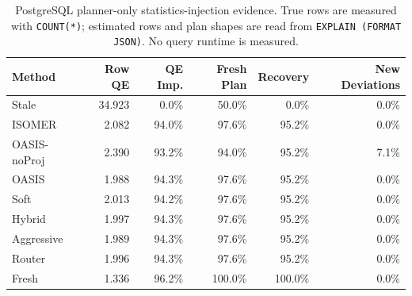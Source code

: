 \begin{table}[t]
  \centering
  \small
  \caption{PostgreSQL planner-only statistics-injection evidence. True rows are measured with \texttt{COUNT(*)}; estimated rows and plan shapes are read from \texttt{EXPLAIN (FORMAT JSON)}. No query runtime is measured.}
  \label{tab:postgres_planner_stats_injection}
  \setlength{\tabcolsep}{4pt}
  \begin{tabular}{lrrrrr}
    \toprule
    Method & Row QE & QE Imp. & Fresh Plan & Recovery & New Deviations \\
    \midrule
    Stale & 34.923 & 0.0\% & 50.0\% & 0.0\% & 0.0\% \\
    ISOMER & 2.082 & 94.0\% & 97.6\% & 95.2\% & 0.0\% \\
    OASIS-noProj & 2.390 & 93.2\% & 94.0\% & 95.2\% & 7.1\% \\
    OASIS & 1.988 & 94.3\% & 97.6\% & 95.2\% & 0.0\% \\
    Soft & 2.013 & 94.2\% & 97.6\% & 95.2\% & 0.0\% \\
    Hybrid & 1.997 & 94.3\% & 97.6\% & 95.2\% & 0.0\% \\
    Aggressive & 1.989 & 94.3\% & 97.6\% & 95.2\% & 0.0\% \\
    Router & 1.996 & 94.3\% & 97.6\% & 95.2\% & 0.0\% \\
    Fresh & 1.336 & 96.2\% & 100.0\% & 100.0\% & 0.0\% \\
    \bottomrule
  \end{tabular}
\end{table}

